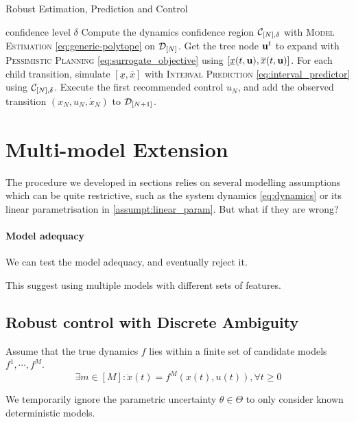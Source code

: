 \documentclass{article}
\begin{document}
\begin{algorithm}[tb]
   \caption{Robust Estimation, Prediction and Control}
   \label{alg:full}
\begin{algorithmic}
    confidence level $\delta$
   \STATE Compute the dynamics confidence region $\mathcal{C}_{[N],\delta}$ with \textsc{Model Estimation} \eqref{eq:generic-polytope} on $\mathcal{D}_{[N]}$.
   \STATE Get the tree node $\mathbf{u}^t$ to expand with \textsc{Pessimistic Planning}  \eqref{eq:surrogate_objective} using $[\underline{x}(t,\mathbf{u}), \overline{x}(t,\mathbf{u})]$.
   \STATE For each child transition, simulate $[\underline{x}, \overline{x}]$ with \textsc{Interval Prediction} \eqref{eq:interval_predictor} using $\mathcal{C}_{[N],\delta}$.
   \ENDFOR
   \STATE Execute the first recommended control $u_N$, and add the observed transition $(x_N, u_N, \dot{x}_N)$ to $\mathcal{D}_{[N+1]}$.
   \ENDFOR
   
\end{algorithmic}
\end{algorithm}

\section{Multi-model Extension}

The procedure we developed in sections relies on several modelling assumptions which can be quite restrictive, such as the system dynamics \eqref{eq:dynamics} or its linear parametrisation in \autoref{assumpt:linear_param}. But what if they are wrong?

\paragraph{Model adequacy}

We can test the model adequacy, and eventually reject it.

This suggest using multiple models with different sets of features.

\subsection{Robust control with Discrete Ambiguity}


\begin{assumption}
Assume that the true dynamics $f$ lies within a finite set of candidate models $f^1, \cdots, f^M$.
\begin{equation}
\exists m\in[M]: \dot{x}(t) = f^M(x(t), u(t)), \forall t\geq 0
\end{equation}

We temporarily ignore the parametric uncertainty $\theta\in\Theta$ to only consider known deterministic models.
\end{assumption}
\end{document}
